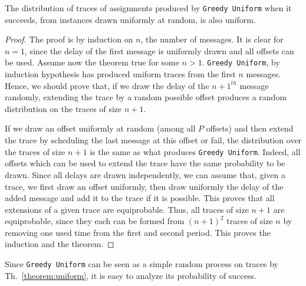 \documentclass[a4paper,UKenglish,cleveref, autoref, thm-restate]{lipics-v2019}
\newcommand\greedyuniform{\texttt{Greedy Uniform}\xspace}
\begin{document}
\begin{theorem}
The distribution of traces of assignments produced by \greedyuniform when it succeeds, from instances drawn uniformly at random, is also uniform.
\end{theorem}
\begin{proof}
The proof is by induction on $n$, the number of messages. It is clear for $n=1$,
since the delay of the first message is uniformly drawn and all offsets can be used.
Assume now the theorem true for some $n>1$. \greedyuniform, by induction hypothesis has produced
uniform traces from the first $n$ messages.  Hence, we should prove that, if we draw the delay
of the $n+1^{th}$ message randomly, extending the trace by a random possible offset produces a random distribution on the traces of size $n+1$. 

 If we draw an offset uniformly at random (among all $P$ offsets) and then extend the trace by scheduling the last message at this offset or fail, the distribution over the traces of size $n+1$ is the same as what produces \greedyuniform. Indeed, all offsets which can be used to extend the trace have the same probability to be drawn. Since all delays are drawn independently, we can assume that, given a trace, we first draw an offset uniformly, then draw uniformly the delay of the added message and add it to the trace if it is possible. This proves that all extensions of a given trace are equiprobable. Thus, all traces of size $n+1$ are equiprobable, since they each can be formed from $(n+1)^2$ traces of size $n$ by removing one used time from the first and second period. This proves the induction and the theorem.
\end{proof}

Since \greedyuniform can be seen as a simple random process on traces by Th.~\ref{theorem:uniform}, it is easy to analyze its probability of success.
\end{document}
